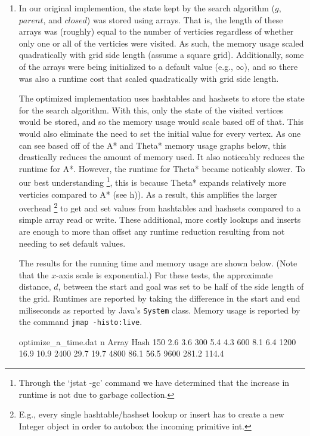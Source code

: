 \documentclass[12pt]{article}
\begin{document}
\begin{enumerate}[label={\large\textbf{\alph*)}}]
\item
In our original implemention, the state kept by the search algorithm ($g$, $parent$, and $closed$)
was stored using arrays. That is, the length of these arrays was (roughly) equal to the number of verticies
regardless of whether only one or all of the verticies were visited.
As such, the memory usage scaled quadratically with grid side length (assume a square grid).
Additionally, some of the arrays were being initialized to a default value (e.g., $\infty$),
and so there was also a runtime cost that scaled quadratically with grid side length.

The optimized implementation uses hashtables and hashsets to store the state for the search algorithm.
With this, only the state of the visited vertices would be stored,
and so the memory usage would scale based off of that.
This would also eliminate the need to set the initial value for every vertex.
As one can see based off of the A* and Theta* memory usage graphs below,
this drastically reduces the amount of memory used.
It also noticeably reduces the runtime for A*.
However, the runtime for Theta* became noticably slower.
To our best understanding
\footnote{Through the `jstat -gc' command we have determined that the increase
in runtime is not due to garbage collection.},
this is because Theta* expands relatively more verticies compared to A* (see h)).
As a result, this amplifies the larger overhead
\footnote{E.g., every single hashtable/hashset lookup or insert has to create a new Integer object
in order to autobox the incoming primitive int.}
to get and set values from hashtables and hashsets compared to a simple array read or write.
These additional, more costly lookups and inserts are enough to more than offset
any runtime reduction resulting from not needing to set default values.

The results for the running time and memory usage are shown below.
(Note that the $x$-axis scale is exponential.)
For these tests, the approximate distance, $d$, between the start and goal
was set to be half of the side length of the grid.
Runtimes are reported by taking the difference in the start and end miliseconds
as reported by Java's \verb|System| class.
Memory usage is reported by the command \verb|jmap -histo:live|.

\begin{filecontents}{optimize_a_time.dat}
n     Array  Hash
150     2.6    3.6
300     5.4    4.3
600     8.1    6.4
1200   16.9   10.9
2400   29.7   19.7
4800   86.1   56.5
9600  281.2  114.4
\end{filecontents}


\end{enumerate}
\end{document}
